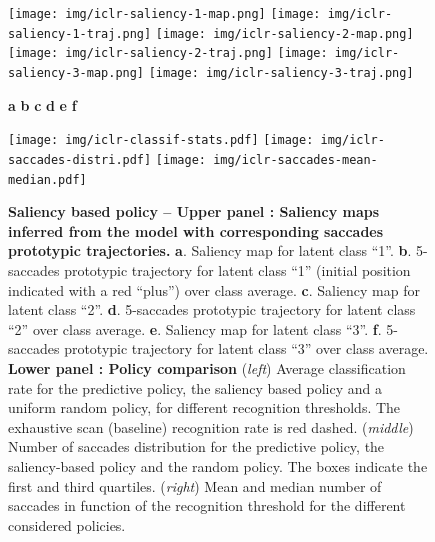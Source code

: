 \documentclass{article} %
\begin{document}
\begin{figure}[t!]
	\centerline{
		\hfill
		\texttt{[image: img/iclr-saliency-1-map.png]}
		\hfill
		\texttt{[image: img/iclr-saliency-1-traj.png]}
		\hfill
		\texttt{[image: img/iclr-saliency-2-map.png]}
		\hfill	
		\texttt{[image: img/iclr-saliency-2-traj.png]}
		\hfill	
		\texttt{[image: img/iclr-saliency-3-map.png]}
		\hfill 
		\texttt{[image: img/iclr-saliency-3-traj.png]}
		\hfill	
	}
	\centerline{
		\hspace{1cm}
		\textbf{a}
		\hfill
		\textbf{b}
		\hfill
		\textbf{c}
		\hfill
		\textbf{d}
		\hfill
		\textbf{e}
		\hfill
		\textbf{f}
		\hspace{1cm}
	}
	\centerline{
		\hfill
		\texttt{[image: img/iclr-classif-stats.pdf]}
		\hfill
		\texttt{[image: img/iclr-saccades-distri.pdf]}
		\hfill	 
		\texttt{[image: img/iclr-saccades-mean-median.pdf]}
		\hfill
	}
	\caption{\textbf{Saliency based policy -- Upper panel : Saliency maps inferred from the model with corresponding saccades prototypic trajectories.} \textbf{a}. Saliency map for latent class ``1''. \textbf{b}. 5-saccades prototypic trajectory for latent class ``1'' (initial position indicated with a red ``plus'') over class average. \textbf{c}. Saliency map for latent class ``2''. \textbf{d}. 5-saccades prototypic trajectory for latent class ``2'' over class average. \textbf{e}. Saliency map for latent class ``3''. \textbf{f}. 5-saccades prototypic trajectory for latent class ``3'' over class average. \textbf{Lower panel : Policy comparison} (\textit{left}) Average classification rate for the predictive policy, the saliency based policy and a uniform random policy, for different recognition thresholds. The exhaustive scan (baseline) recognition rate is  red dashed. (\textit{middle}) Number of saccades distribution for the predictive policy, the saliency-based policy and the random policy. The boxes indicate the first and third quartiles. (\textit{right}) Mean and median number of saccades in function of the recognition threshold for the different considered policies. }\label{fig:saliency-maps}
\end{figure}
\end{document}
